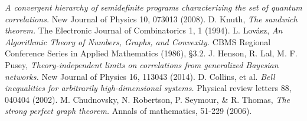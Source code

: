 \documentclass[letterpaper]{article}
\begin{document}
\begin{thebibliography}{}
         {\em A convergent hierarchy of semidefinite programs characterizing the
         set of quantum correlations.}
         New Journal of Physics 10, 073013 (2008).
    D. Knuth, 
        {\em The sandwich theorem.}
        The Electronic Journal of Combinatorics 1, 1 (1994).
    L. Lovász, 
         {\em An Algorithmic Theory of Numbers, Graphs, and Convexity.}
         CBMS Regional Conference Series in Applied Mathematics (1986), §3.2.
    J. Henson, R. Lal, M. F. Pusey,
        {\em Theory-independent limits on correlations from generalized Bayesian networks.}
        New Journal of Physics 16, 113043 (2014).
    D. Collins, et al. 
        {\em Bell inequalities for arbitrarily high-dimensional systems.}
        Physical review letters 88, 040404 (2002).
    M. Chudnovsky, N. Robertson, P. Seymour, \& R. Thomas, 
         {\em The strong perfect graph theorem.} 
         Annals of mathematics, 51-229 (2006).









         
         
         
         
         
         
         
\end{thebibliography}

\end{document}
